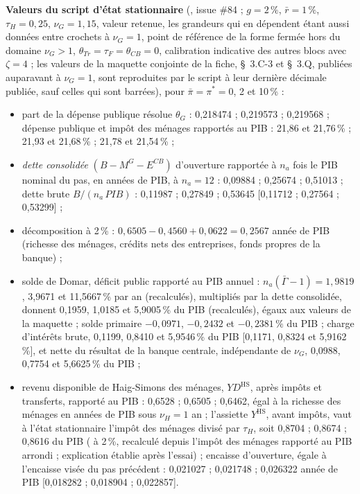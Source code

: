 \documentclass[11pt,a4paper]{article}
\newcommand{\code}[1]{\texttt{\detokenize{#1}}}
\newcommand{\barre}[1]{\leavevmode\sbox{\boitebarre}{#1}\rlap{\rule[0.6ex]{\wd\boitebarre}{0.4pt}}\usebox{\boitebarre}}
\begin{document}
\begin{proposee}
\textbf{Valeurs du script d'état stationnaire} (\code{outils/etat_stationnaire.py}, issue \#84 ; $g = 2\,\%$, $\bar r = 1\,\%$, $\tau_H = 0{,}25$, $\nu_G = 1{,}15$, valeur retenue, les grandeurs qui en dépendent étant aussi données entre crochets à $\nu_G = 1$, point de référence de la forme fermée hors du domaine $\nu_G > 1$, $\theta_{\mathit{Tr}} = \tau_F = \theta_{\mathit{CB}} = 0$, calibration indicative des autres blocs avec $\zeta = 4$ ; les valeurs de la maquette conjointe de la fiche, \S~3.C-3 et \S~3.Q, publiées auparavant à $\nu_G = 1$, sont reproduites par le script à leur dernière décimale publiée, sauf celles qui sont barrées), pour $\bar\pi = \pi^\ast = 0$, 2 et 10\,\% :
\begin{itemize}
\item part de la dépense publique résolue $\theta_G$ : 0,218474 ; 0,219573 ; 0,219568 ; dépense publique et impôt des ménages rapportés au PIB : 21,86 et 21,76\,\% ; 21,93 et 21,68\,\% ; 21,78 et 21,54\,\% ;
\item \emph{dette consolidée} $(B - M^G - E^{\mathit{CB}})$ d'ouverture rapportée à $n_a$ fois le PIB nominal du pas, en années de PIB, à $n_a = 12$ : 0,09884 ; 0,25674 ; 0,51013 ; dette brute $B/(n_a\,\mathit{PIB})$ : 0,11987 ; 0,27849 ; 0,53645 [0,11712 ; 0,27564 ; 0,53299] ;
\item décomposition à 2\,\% : $0{,}6505 - 0{,}4560 + 0{,}0622 = 0{,}2567$ année de PIB (richesse des ménages, crédits nets des entreprises, fonds propres de la banque) ;
\item solde de Domar, déficit public rapporté au PIB annuel : $n_a(\bar\Gamma - 1) = 1{,}9819$, 3,9671 et 11,5667\,\% par an (recalculés), multipliés par la dette consolidée, donnent 0,1959, 1,0185 et 5,9005\,\% du PIB (recalculés), égaux aux valeurs de la maquette ; solde primaire $-0{,}0971$, $-0{,}2432$ et $-0{,}2381\,\%$ du PIB ; charge d'intérêts brute, 0,1199, 0,8410 et 5,9546\,\% du PIB [0,1171, 0,8324 et 5,9162\,\%], et nette du résultat de la banque centrale, indépendante de $\nu_G$, 0,0988, 0,7754 et 5,6625\,\% du PIB ;
\item revenu disponible de Haig-Simons des ménages, $\mathit{YD}^{\mathrm{HS}}$, après impôts et transferts, rapporté au PIB : 0,6528 ; 0,6505 ; 0,6462, égal à la richesse des ménages en années de PIB sous $\nu_H = 1$ an ; l'assiette $Y^{\mathrm{HS}}$, avant impôts, vaut à l'état stationnaire l'impôt des ménages divisé par $\tau_H$, soit 0,8704 ; 0,8674 ; 0,8616 du PIB (\barre{0,8672} à 2\,\%, recalculé depuis l'impôt des ménages rapporté au PIB arrondi ; explication établie après l'essai) ; encaisse d'ouverture, égale à l'encaisse visée du pas précédent : 0,021027 ; 0,021748 ; 0,026322 année de PIB [0,018282 ; 0,018904 ; 0,022857].

\end{itemize}
\end{proposee}
\end{document}
